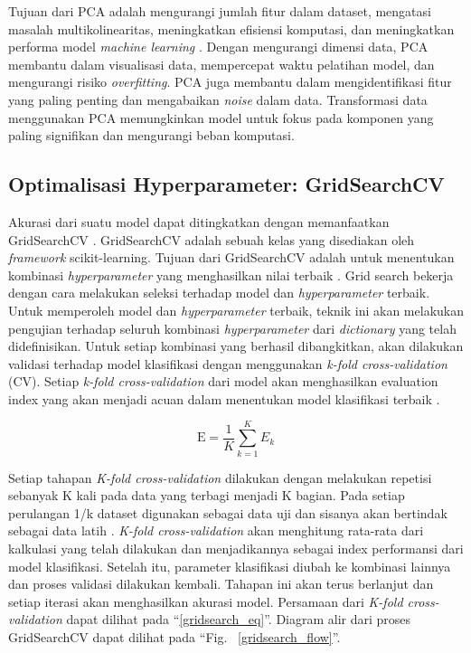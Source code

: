 \documentclass[conference]{IEEEtran}
\begin{document}
Tujuan dari PCA adalah mengurangi jumlah fitur dalam dataset, mengatasi masalah multikolinearitas, meningkatkan efisiensi komputasi, dan meningkatkan performa model 
\textit{machine learning} \cite{b39}. Dengan mengurangi dimensi data, PCA membantu dalam visualisasi data, mempercepat waktu pelatihan model, dan mengurangi risiko \textit{overfitting}. 
PCA juga membantu dalam mengidentifikasi fitur yang paling penting dan mengabaikan \textit{noise} dalam data. Transformasi data menggunakan PCA memungkinkan model untuk fokus pada 
komponen yang paling signifikan dan mengurangi beban komputasi.

\subsection{Optimalisasi Hyperparameter: GridSearchCV}

Akurasi dari suatu model dapat ditingkatkan dengan memanfaatkan GridSearchCV \cite{b40}.  GridSearchCV adalah sebuah kelas yang disediakan oleh \textit{framework} scikit-learning. 
Tujuan dari GridSearchCV adalah untuk menentukan kombinasi \textit{hyperparameter} yang menghasilkan nilai terbaik \cite{b41}. Grid search bekerja dengan cara melakukan seleksi terhadap model 
dan \textit{hyperparameter} terbaik. Untuk memperoleh model dan \textit{hyperparameter} terbaik, teknik ini akan melakukan pengujian terhadap 
seluruh kombinasi \textit{hyperparameter} dari \textit{dictionary} yang telah didefinisikan. Untuk setiap kombinasi yang berhasil dibangkitkan, akan dilakukan 
validasi terhadap model klasifikasi dengan menggunakan \textit{k-fold  cross-validation} (CV). Setiap \textit{k-fold cross-validation} dari model akan 
menghasilkan evaluation index yang akan menjadi acuan dalam menentukan model klasifikasi terbaik \cite{b42}.

\begin{equation}
    \text{E} = \frac{1}{K} \sum_{k=1}^{K} E_k \label{gridsearch_eq}
\end{equation}

Setiap tahapan \textit{K-fold cross-validation} dilakukan dengan melakukan repetisi sebanyak K kali pada data yang terbagi menjadi K bagian. Pada setiap perulangan 1/k dataset 
digunakan sebagai data uji dan sisanya akan bertindak sebagai data latih \cite{b43}. \textit{K-fold cross-validation} akan menghitung rata-rata dari kalkulasi yang telah dilakukan dan menjadikannya sebagai 
index performansi dari model klasifikasi. Setelah itu, parameter klasifikasi diubah ke kombinasi lainnya dan proses validasi dilakukan kembali. Tahapan ini akan terus berlanjut dan setiap iterasi akan menghasilkan 
akurasi model. Persamaan dari \textit{K-fold cross-validation} dapat dilihat pada ``\eqref{gridsearch_eq}''. Diagram alir dari proses GridSearchCV dapat dilihat pada ``Fig. ~\ref{gridsearch_flow}''.
\end{document}
